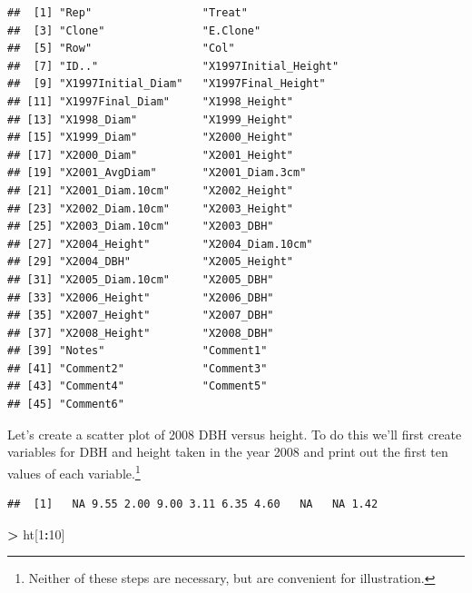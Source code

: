 \documentclass[]{krantz}
\makeatletter
\newenvironment{Shaded}{\begin{snugshade}}{\end{snugshade}}
\newcommand{\DecValTok}[1]{\textcolor[rgb]{0.06,0.06,0.06}{#1}}
\newcommand{\StringTok}[1]{\textcolor[rgb]{0.5,0.5,0.5}{#1}}
\newcommand{\OperatorTok}[1]{\textcolor[rgb]{0.43,0.43,0.43}{\textbf{#1}}}
\newcommand{\NormalTok}[1]{#1}
\newenvironment{kframe}{%
\medskip{}
\setlength{\fboxsep}{.8em}
 \def\at@end@of@kframe{}%
 \ifinner\ifhmode%
  \def\at@end@of@kframe{\end{minipage}}%
  \begin{minipage}{\columnwidth}%
 \fi\fi%
 \def\FrameCommand##1{\hskip\@totalleftmargin \hskip-\fboxsep
 \colorbox{shadecolor}{##1}\hskip-\fboxsep
     \hskip-\linewidth \hskip-\@totalleftmargin \hskip\columnwidth}%
 \MakeFramed {\advance\hsize-\width
   \@totalleftmargin\z@ \linewidth\hsize
   \@setminipage}}%
 {\par\unskip\endMakeFramed%
 \at@end@of@kframe}
\renewenvironment{Shaded}{\begin{kframe}}{\end{kframe}}
\theoremstyle{definition}
\theoremstyle{definition}
\theoremstyle{definition}
\theoremstyle{remark}
\makeatother
\begin{document}
\begin{verbatim}
##  [1] "Rep"                 "Treat"              
##  [3] "Clone"               "E.Clone"            
##  [5] "Row"                 "Col"                
##  [7] "ID.."                "X1997Initial_Height"
##  [9] "X1997Initial_Diam"   "X1997Final_Height"  
## [11] "X1997Final_Diam"     "X1998_Height"       
## [13] "X1998_Diam"          "X1999_Height"       
## [15] "X1999_Diam"          "X2000_Height"       
## [17] "X2000_Diam"          "X2001_Height"       
## [19] "X2001_AvgDiam"       "X2001_Diam.3cm"     
## [21] "X2001_Diam.10cm"     "X2002_Height"       
## [23] "X2002_Diam.10cm"     "X2003_Height"       
## [25] "X2003_Diam.10cm"     "X2003_DBH"          
## [27] "X2004_Height"        "X2004_Diam.10cm"    
## [29] "X2004_DBH"           "X2005_Height"       
## [31] "X2005_Diam.10cm"     "X2005_DBH"          
## [33] "X2006_Height"        "X2006_DBH"          
## [35] "X2007_Height"        "X2007_DBH"          
## [37] "X2008_Height"        "X2008_DBH"          
## [39] "Notes"               "Comment1"           
## [41] "Comment2"            "Comment3"           
## [43] "Comment4"            "Comment5"           
## [45] "Comment6"
\end{verbatim}

Let's create a scatter plot of 2008 DBH versus height. To do this we'll
first create variables for DBH and height taken in the year 2008 and
print out the first ten values of each variable.\footnote{Neither of
  these steps are necessary, but are convenient for illustration.}

\begin{Shaded}
\end{Shaded}

\begin{verbatim}
##  [1]   NA 9.55 2.00 9.00 3.11 6.35 4.60   NA   NA 1.42
\end{verbatim}

\begin{Shaded}
\begin{Highlighting}[]
\OperatorTok{>}\StringTok{ }\NormalTok{ht[}\DecValTok{1}\OperatorTok{:}\DecValTok{10}\NormalTok{]}
\end{Highlighting}
\end{Shaded}
\end{document}

